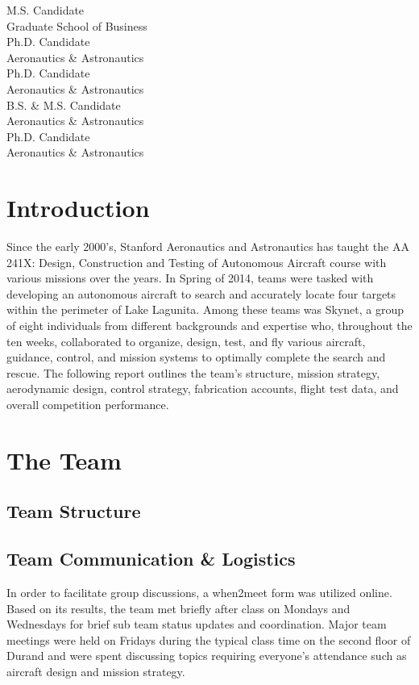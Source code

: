 \documentclass[11pt]{article}
\begin{document}
\begin{titlepage}
\begin{center}
\begin{minipage}{0.4\textwidth}
\begin{flushright}
M.S. Candidate\\
Graduate School of Business\\[0.5cm]
Ph.D. Candidate\\
Aeronautics \& Astronautics\\[0.5cm]
Ph.D. Candidate\\
Aeronautics \& Astronautics\\[0.5cm]
B.S. \& M.S. Candidate\\
Aeronautics \& Astronautics\\[0.5cm]
Ph.D. Candidate\\
Aeronautics \& Astronautics\\[0.5cm]
\end{flushright}
\end{minipage}
\end{center}
\end{titlepage}

\clearpage
\tableofcontents
\vfill
\clearpage

\section{Introduction}
\label{Introduction}
Since the early 2000's, Stanford Aeronautics and Astronautics has taught the AA 241X: Design, Construction and Testing of Autonomous Aircraft course with various missions over the years. In Spring of 2014, teams were tasked with developing an autonomous aircraft to search and accurately locate four targets within the perimeter of Lake Lagunita. Among these teams was Skynet, a group of eight individuals from different backgrounds and expertise who, throughout the ten weeks, collaborated to organize, design, test, and fly various aircraft, guidance, control, and mission systems to optimally complete the search and rescue. The following report outlines the team's structure, mission strategy, aerodynamic design, control strategy, fabrication accounts, flight test data, and overall competition performance.

\section{The Team}
\label{Team}
\subsection{Team Structure}
\label{TeamStrc}
\subsection{Team Communication \& Logistics}
\label{TeamCommLog}
In order to facilitate group discussions, a when2meet form was utilized online. Based on its results, the team met briefly after class on Mondays and Wednesdays for brief sub team status updates and coordination. Major team meetings were held on Fridays during the typical class time on the second floor of Durand and were spent discussing topics requiring everyone's attendance such as aircraft design and mission strategy.
\end{document}
